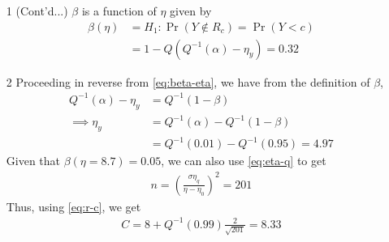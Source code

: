 \documentclass{beamer}
\providecommand{\pr}[1]{\ensuremath{\Pr\left(#1\right)}}
\begin{document}
\begin{frame}
	\begin{enumerate}
		\item[1] (Cont'd...) $\beta$ is a function of $\eta$ given by
			\begin{align}
				\beta(\eta) &= H_1:\pr{Y \notin R_c} = \pr{Y < c} \\
				&= 1 - Q(Q^{-1}(\alpha) - \eta_y) = 0.32
				\label{eq:beta-eta}
			\end{align}
		\item[2] Proceeding in reverse from \eqref{eq:beta-eta}, we have from the definition of $\beta$, 
			\begin{align}
				Q^{-1}(\alpha) - \eta_y &= Q^{-1}(1 - \beta) \\
				\implies \eta_y &= Q^{-1}(\alpha) - Q^{-1}(1 - \beta) \\
				&= Q^{-1}(0.01) - Q^{-1}(0.95) = 4.97
				\label{eq:eta-q-rev}
			\end{align}
			Given that $\beta(\eta = 8.7) = 0.05$, we can also use \eqref{eq:eta-q} to get 
			\begin{align}
				n = \left(\frac{\sigma\eta_q}{\eta - \eta_0}\right)^2 = 201
				\label{eq:n}
			\end{align}
			Thus, using \eqref{eq:r-c}, we get 
			\begin{align}
				C = 8 + Q^{-1}(0.99)\frac{2}{\sqrt{201}} = 8.33
				\label{eq:c-ans}
			\end{align}
	\end{enumerate}
\end{frame}
\end{document}
